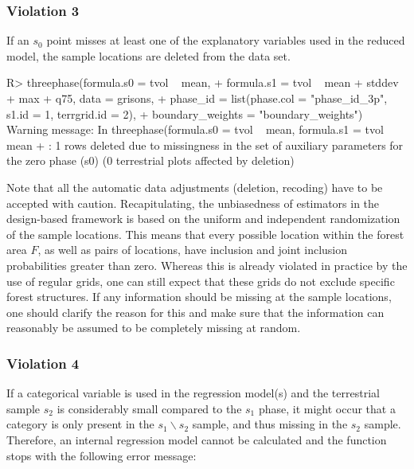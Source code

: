 \documentclass[article]{jss}
\begin{document}
\subsubsection*{Violation 3}

If an $s_0$ point misses at least one of the explanatory variables used in the reduced model, the sample locations are deleted from the data set.


\begin{Schunk}
\end{Schunk}



\begin{Schunk}
\begin{Sinput}
R> threephase(formula.s0 = tvol ~ mean, 
+    formula.s1 = tvol ~  mean + stddev + max + q75,  data = grisons,
+    phase_id = list(phase.col = "phase_id_3p", s1.id = 1, terrgrid.id = 2),
+    boundary_weights = "boundary_weights")
Warning message:
In threephase(formula.s0 = tvol ~ mean, formula.s1 = tvol ~ mean +  :
  1 rows deleted due to missingness in the set of auxiliary parameters for the 
  zero phase (s0) (0 terrestrial plots affected by deletion)
\end{Sinput}
\end{Schunk}


Note that all the automatic data adjustments (deletion, recoding) have to be accepted with caution. Recapitulating, the unbiasedness of estimators in the design-based framework is based on the uniform and independent randomization of the sample locations. This means that every possible location within the forest area $F$, as well as pairs of locations, have inclusion and joint inclusion probabilities greater than zero. Whereas this is already violated in practice by the use of regular grids, one can still expect that these grids do not exclude specific forest structures. If any information should be missing at the sample locations, one should clarify the reason for this and make sure that the information can reasonably be assumed to be completely missing at random.


\subsubsection*{Violation 4}

If a categorical variable is used in the regression model(s) and the terrestrial sample $s_2$ is considerably small compared to the $s_1$ phase, it might occur that a category is only present in the $s_1 \backslash s_2$ sample, and thus missing in the $s_2$ sample. Therefore, an internal regression model cannot be calculated and the function stops with the following error message:
\end{document}
